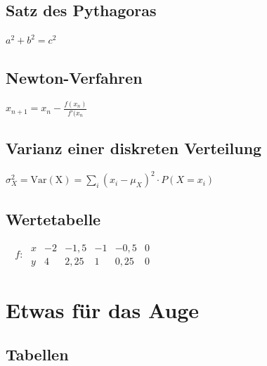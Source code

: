 \documentclass{scrreprt}
\begin{document}
		\section{Satz des Pythagoras} 

			\vspace{2pt}
			
			$ a^{2} + b^{2} = c^{2}
			\label{eq:pythagoras} $
			\vspace{10pt}
			\newline
		\section{Newton-Verfahren}

		\vspace{2pt}

			$ x_{n+1} = x_{n} - \frac{f(x_{n})}{f'(x_{n}} 
			\label{eq:newtonverfahren} $
			\vspace{10pt}
			\newline
		\section{Varianz einer diskreten Verteilung} 

			\vspace{2pt}

			$ \sigma^2_{X} = \mathrm{Var(X)} = \sum_i (x_i - \mu_{X})^2 \cdot P(X = x_i) \label{eq:varianzdiskret} $
			\vspace{10pt}
			\newline
		\section{Wertetabelle} 

		\vspace{2pt}

			$ \phantom{^{-1}}f\colon\; \begin{array}{r|c|c|c|c|c} x & -2 & -1,5 & -1 & -0,5 & 0 \\ \hline y & 4 & 2,25 & 1 & 0,25 & 0 \end{array} 
			\label{eq:wertetabelle} $

	\chapter{Etwas für das Auge}
		\section{Tabellen}
			\label{se:tabellen}
\end{document}
